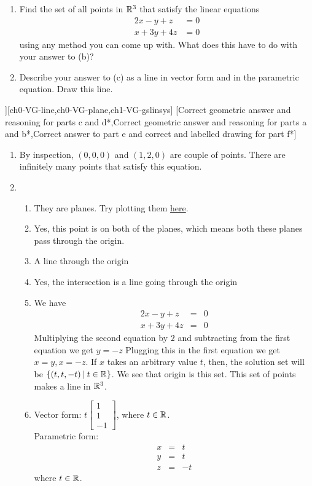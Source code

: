 \begin{SaveQuestion}
{\begin{enumerate}
\begin{enumerate}
            \item Find the set of all points  in $\mathbb{R}^3$ that satisfy the linear equations $$\begin{aligned} 2x - y + z &= 0\\ x + 3y + 4 z &= 0 \end{aligned}$$ using any method you can come up with. What does this have to do with your answer to (b)?
            \item Describe your answer to (c) as a line in vector form and in the parametric equation. Draw this line.
            \end{enumerate}
        \end{enumerate}}
 ][ch0-VG-line,ch0-VG-plane,ch1-VG-gslinsys]
    [Correct geometric answer and reasoning for parts c and d*,Correct geometric answer and reasoning for parts a and b*,Correct answer to part e and correct and labelled drawing for part f*]
    \begin{enumerate}
        \item By inspection, $(0, 0, 0)$ and $(1,2,0)$ are couple of points. There are infinitely many points that satisfy this equation.
        \item \begin{enumerate}
	\item  They are planes. Try plotting them \href{https://www.geogebra.org/3d}{here}. 
	\item Yes, this point is on both of the planes, which means both these planes pass through the origin. 
	\item A line through the origin
	\item Yes, the intersection is a line going through the origin
        \item We have \begin{eqnarray*} 2x-y+z&=&0\\ x+3y+4z&=&0 \end{eqnarray*}
	Multiplying the second equation by $2$ and subtracting from the first equation we get $y=-z$
	Plugging this in the first equation we get $x=y, x=-z$. 
	If $x$ takes an arbitrary value $t$, then, the solution set will be  $\{(t, 
	t, -t)\:|\: t\in \mathbb{R}\}$. We see that origin is this set. This set of points makes a line in $\mathbb{R}^3$. 
	   \item Vector form: $t\begin{bmatrix} 1\\1\\-1 \end{bmatrix}$, where $t\in \mathbb{R}$. \\
        Parametric form: \begin{eqnarray*} x&=&t\\y&=&t\\z&=&-t \end{eqnarray*} where $t\in \mathbb{R}$.
        \end{enumerate}
    \end{enumerate}
\end{SaveQuestion}



